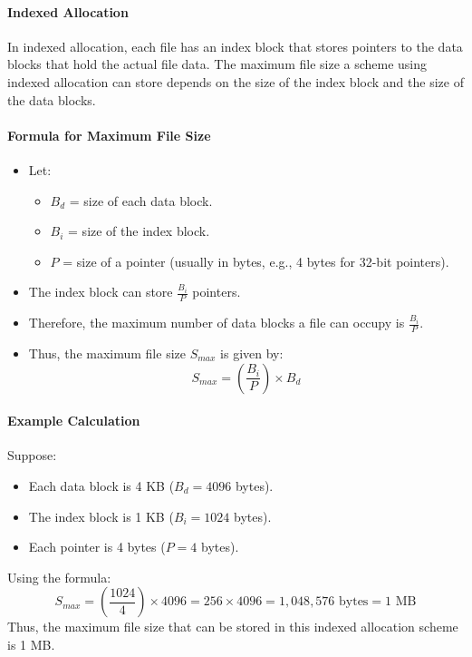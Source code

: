\paragraph{Indexed Allocation}
In indexed allocation, each file has an index block that stores pointers to the data blocks that hold the actual file data. The maximum file size a scheme using indexed allocation can store depends on the size of the index block and the size of the data blocks.

\paragraph{Formula for Maximum File Size}
\begin{itemize}
    \item Let:
    \begin{itemize}
        \item $B_d$ = size of each data block.
        \item $B_i$ = size of the index block.
        \item $P$ = size of a pointer (usually in bytes, e.g., 4 bytes for 32-bit pointers).
    \end{itemize}
    \item The index block can store $\frac{B_i}{P}$ pointers.
    \item Therefore, the maximum number of data blocks a file can occupy is $\frac{B_i}{P}$.
    \item Thus, the maximum file size $S_{max}$ is given by:
    \[
    S_{max} = \left( \frac{B_i}{P} \right) \times B_d
    \]
\end{itemize}

\paragraph{Example Calculation}
Suppose:
\begin{itemize}
    \item Each data block is 4 KB ($B_d = 4096$ bytes).
    \item The index block is 1 KB ($B_i = 1024$ bytes).
    \item Each pointer is 4 bytes ($P = 4$ bytes).
\end{itemize}

Using the formula:
\[
S_{max} = \left( \frac{1024}{4} \right) \times 4096 = 256 \times 4096 = 1,048,576 \text{ bytes} = 1 \text{ MB}
\]
Thus, the maximum file size that can be stored in this indexed allocation scheme is 1 MB.




